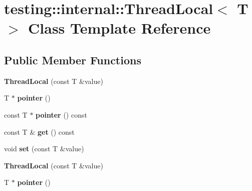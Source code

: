 \hypertarget{classtesting_1_1internal_1_1_thread_local}{}\section{testing\+:\+:internal\+:\+:Thread\+Local$<$ T $>$ Class Template Reference}
\label{classtesting_1_1internal_1_1_thread_local}
\subsection*{Public Member Functions}
\begin{DoxyCompactItemize}
\item 
\hypertarget{classtesting_1_1internal_1_1_thread_local_a85610bdfdbc93a4c56215e0aad7da870}{}{\bfseries Thread\+Local} (const T \&value)\label{classtesting_1_1internal_1_1_thread_local_a85610bdfdbc93a4c56215e0aad7da870}

\item 
\hypertarget{classtesting_1_1internal_1_1_thread_local_a882f57fed4b074de83693c0c0fe62858}{}T $\ast$ {\bfseries pointer} ()\label{classtesting_1_1internal_1_1_thread_local_a882f57fed4b074de83693c0c0fe62858}

\item 
\hypertarget{classtesting_1_1internal_1_1_thread_local_af4b33c12fd2da7d43d8654feccca77f7}{}const T $\ast$ {\bfseries pointer} () const \label{classtesting_1_1internal_1_1_thread_local_af4b33c12fd2da7d43d8654feccca77f7}

\item 
\hypertarget{classtesting_1_1internal_1_1_thread_local_a9cfa47ae6e9e8c19fe8782e2e9c1b13e}{}const T \& {\bfseries get} () const \label{classtesting_1_1internal_1_1_thread_local_a9cfa47ae6e9e8c19fe8782e2e9c1b13e}

\item 
\hypertarget{classtesting_1_1internal_1_1_thread_local_ab5ebc7ba07426cef7167afa2a7707eb4}{}void {\bfseries set} (const T \&value)\label{classtesting_1_1internal_1_1_thread_local_ab5ebc7ba07426cef7167afa2a7707eb4}

\item 
\hypertarget{classtesting_1_1internal_1_1_thread_local_a85610bdfdbc93a4c56215e0aad7da870}{}{\bfseries Thread\+Local} (const T \&value)\label{classtesting_1_1internal_1_1_thread_local_a85610bdfdbc93a4c56215e0aad7da870}

\item 
\hypertarget{classtesting_1_1internal_1_1_thread_local_a882f57fed4b074de83693c0c0fe62858}{}T $\ast$ {\bfseries pointer} ()\label{classtesting_1_1internal_1_1_thread_local_a882f57fed4b074de83693c0c0fe62858}


\end{DoxyCompactItemize}
